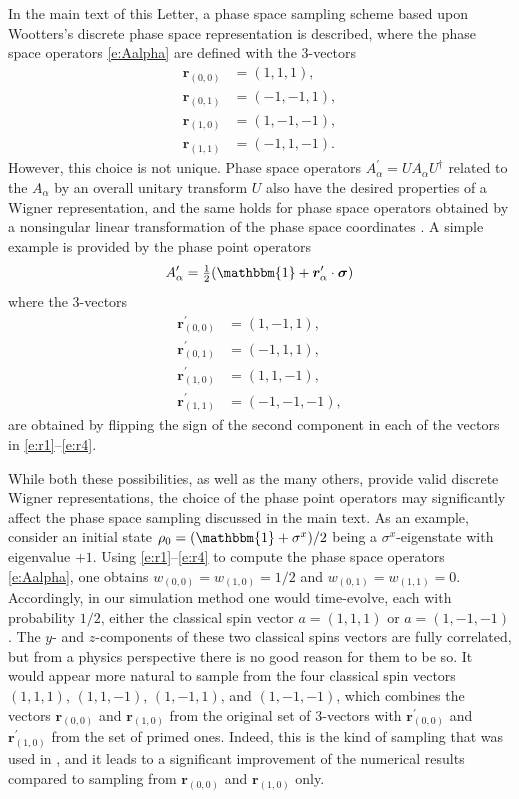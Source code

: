 \documentclass[aps,prl,showpacs,amsmath,amssymb,superscriptaddress,reprint,10pt]{revtex4-1}
\newcommand\id{{\mathbbm{1}}}
\newcommand{\mvec}[1]{\boldsymbol #1}
\begin{document}
In the main text of this Letter, a phase space sampling scheme based upon Wootters's discrete phase space representation is described, where the phase space operators \eqref{e:Aalpha} are defined with the 3-vectors
\begin{subequations}
\begin{align}
\mvec{r}_{(0,0)}&=(1,1,1),\label{e:r1}\\
\mvec{r}_{(0,1)}&=(-1,-1,1),\\
\mvec{r}_{(1,0)}&=(1,-1,-1),\\
\mvec{r}_{(1,1)}&=(-1,1,-1).\label{e:r4}
\end{align}
\end{subequations}
However, this choice is not unique. Phase space operators $A_\alpha^\prime=UA_\alpha U^\dagger$ related to the $A_\alpha$ by an overall unitary transform $U$ also have the desired properties of a Wigner representation, and the same holds for phase space operators obtained by a nonsingular linear transformation of the phase space coordinates \cite{Wootters87}. A simple example is provided by the phase point operators
\begin{equation}
A_\alpha^\prime = \tfrac{1}{2}(\id+\mvec{r}_\alpha^\prime\cdot\mvec{\sigma})
\end{equation}
where the 3-vectors
\begin{subequations}
\begin{align}
\mvec{r}_{(0,0)}^\prime&=(1,-1,1),\\
\mvec{r}_{(0,1)}^\prime&=(-1,1,1),\\
\mvec{r}_{(1,0)}^\prime&=(1,1,-1),\\
\mvec{r}_{(1,1)}^\prime&=(-1,-1,-1),
\end{align}
\end{subequations}
are obtained by flipping the sign of the second component in each of the vectors in \eqref{e:r1}--\eqref{e:r4}.

While both these possibilities, as well as the many others, provide valid discrete Wigner representations, the choice of the phase point operators may significantly affect the phase space sampling discussed in the main text. As an example, consider an initial state $\rho_0 = (\id+\sigma^x)/2$ being a $\sigma^x$-eigenstate with eigenvalue $+1$. Using \eqref{e:r1}--\eqref{e:r4} to compute the phase space operators \eqref{e:Aalpha}, one obtains $w_{(0,0)}=w_{(1,0)}=1/2$ and 
$w_{(0,1)}=w_{(1,1)}=0$. Accordingly, in our simulation method one would time-evolve, each with probability $1/2$, either the classical spin vector $a=(1,1,1)$ or $a=(1,-1,-1)$. The $y$- and $z$-components of these two classical spins vectors are fully correlated, but from a physics perspective there is no good reason for them to be so. It would appear more natural to sample from the four classical spin vectors $(1,1,1)$, $(1,1,-1)$, $(1,-1,1)$, and $(1,-1,-1)$, which combines the vectors $\mvec{r}_{(0,0)}$ and $\mvec{r}_{(1,0)}$ from the original set of 3-vectors with $\mvec{r}_{(0,0)}^\prime$ and $\mvec{r}_{(1,0)}^\prime$ from the set of primed ones. Indeed, this is the kind of sampling that was used in \cite{Schachenmayer_etal15}, and it leads to a significant improvement of the numerical results compared to sampling from $\mvec{r}_{(0,0)}$ and $\mvec{r}_{(1,0)}$ only.
\end{document}

